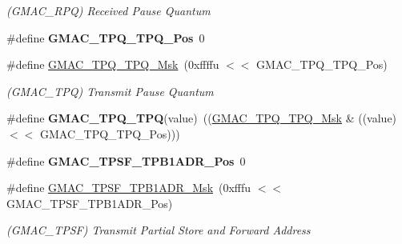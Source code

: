 \begin{DoxyCompactItemize}
\begin{DoxyCompactList}\small\item\em (G\+M\+A\+C\+\_\+\+R\+PQ) Received Pause Quantum \end{DoxyCompactList}\item 
\mbox{\label{group__SAMV71__GMAC_ga499a777bde45cefb80e701d01c94270f}} 
\#define {\bfseries G\+M\+A\+C\+\_\+\+T\+P\+Q\+\_\+\+T\+P\+Q\+\_\+\+Pos}~0
\item 
\mbox{\label{group__SAMV71__GMAC_ga96640d37990bbf63b4de1ce164c75577}} 
\#define \mbox{\hyperlink{group__SAMV71__GMAC_ga96640d37990bbf63b4de1ce164c75577}{G\+M\+A\+C\+\_\+\+T\+P\+Q\+\_\+\+T\+P\+Q\+\_\+\+Msk}}~(0xffffu $<$$<$ G\+M\+A\+C\+\_\+\+T\+P\+Q\+\_\+\+T\+P\+Q\+\_\+\+Pos)
\begin{DoxyCompactList}\small\item\em (G\+M\+A\+C\+\_\+\+T\+PQ) Transmit Pause Quantum \end{DoxyCompactList}\item 
\mbox{\label{group__SAMV71__GMAC_gaf802993e6cc516824a1d79878a52695b}} 
\#define {\bfseries G\+M\+A\+C\+\_\+\+T\+P\+Q\+\_\+\+T\+PQ}(value)~((\mbox{\hyperlink{group__SAMV71__GMAC_ga96640d37990bbf63b4de1ce164c75577}{G\+M\+A\+C\+\_\+\+T\+P\+Q\+\_\+\+T\+P\+Q\+\_\+\+Msk}} \& ((value) $<$$<$ G\+M\+A\+C\+\_\+\+T\+P\+Q\+\_\+\+T\+P\+Q\+\_\+\+Pos)))
\item 
\mbox{\label{group__SAMV71__GMAC_ga5a938aff37867468717270bf57e841c1}} 
\#define {\bfseries G\+M\+A\+C\+\_\+\+T\+P\+S\+F\+\_\+\+T\+P\+B1\+A\+D\+R\+\_\+\+Pos}~0
\item 
\mbox{\label{group__SAMV71__GMAC_ga4af004798e3b626f8ce57da437c8dd72}} 
\#define \mbox{\hyperlink{group__SAMV71__GMAC_ga4af004798e3b626f8ce57da437c8dd72}{G\+M\+A\+C\+\_\+\+T\+P\+S\+F\+\_\+\+T\+P\+B1\+A\+D\+R\+\_\+\+Msk}}~(0xfffu $<$$<$ G\+M\+A\+C\+\_\+\+T\+P\+S\+F\+\_\+\+T\+P\+B1\+A\+D\+R\+\_\+\+Pos)
\begin{DoxyCompactList}\small\item\em (G\+M\+A\+C\+\_\+\+T\+P\+SF) Transmit Partial Store and Forward Address \end{DoxyCompactList}\item 
\mbox{\label{group__SAMV71__GMAC_ga0ea54c6aa0c95f36f4527108721426c4}} 
$$
\end{DoxyCompactItemize}
